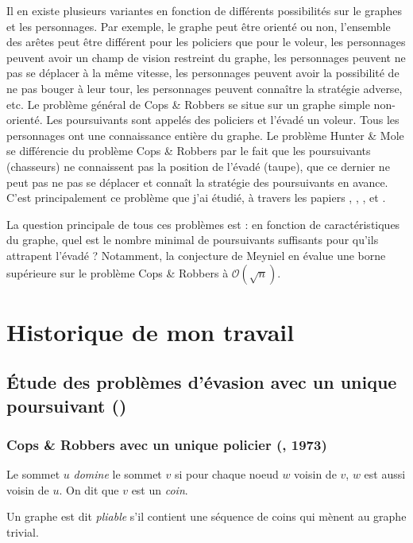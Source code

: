 \documentclass[12pt]{article}
\newcommand{\bigo}{\mathcal{O}}
\newcommand{\cp}{Cops \& Robbers\xspace}
\newcommand{\hm}{Hunter \& Mole\xspace}
\begin{document}
Il en existe plusieurs variantes en fonction de différents possibilités sur le graphes et les personnages. Par exemple, le graphe peut être orienté ou non, l'ensemble des arêtes peut être différent pour les policiers que pour le voleur, les personnages peuvent avoir un champ de vision restreint du graphe, les personnages peuvent ne pas se déplacer à la même vitesse, les personnages peuvent avoir la possibilité de ne pas bouger à leur tour, les personnages peuvent connaître la stratégie adverse, etc. Le problème général de \cp se situe sur un graphe simple non-orienté. Les poursuivants sont appelés des policiers et l'évadé un voleur. Tous les personnages ont une connaissance entière du graphe. Le problème \hm se différencie du problème \cp par le fait que les poursuivants (chasseurs) ne connaissent pas la position de l'évadé (taupe), que ce dernier ne peut pas ne pas se déplacer et connaît la stratégie des poursuivants en avance. C'est principalement ce problème que j'ai étudié, à travers les papiers \cite{komarov2013hunter}, \cite{tayy2016evasion}, \cite{abramovskaya2016hunt}, \cite{britnell2012finding} et \cite{guggiari2018approximating}.

La question principale de tous ces problèmes est : en fonction de caractéristiques du graphe, quel est le nombre minimal de poursuivants suffisants pour qu'ils attrapent l'évadé ? Notamment, la conjecture de Meyniel en évalue une borne supérieure sur le problème \cp à $\bigo(\sqrt{n})$.

\section{Historique de mon travail}

\subsection{\'Etude des problèmes d'évasion avec un unique poursuivant (\cite{komarov2015hunter})}

\subsubsection{\cp avec un unique policier (\cite{nowakowski1983vertex}, 1973)}

Le sommet $u$ \emph{domine} le sommet $v$ si pour chaque noeud $w$ voisin de $v$, $w$ est aussi voisin de $u$. On dit que $v$ est un \emph{coin}.

Un graphe est dit \emph{pliable} s'il contient une séquence de coins qui mènent au graphe trivial.
\end{document}
